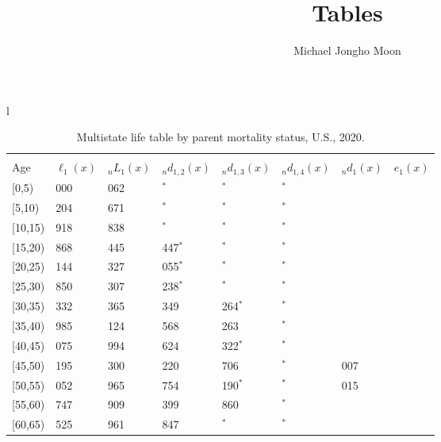 \documentclass[
]{article}
\title{Tables}
\author{Michael Jongho Moon}
\date{}
\begin{document}
\maketitle

\begin{table}
\caption{\label{tab:table-all}Multistate life table by parent mortality status, U.S., 2020.}

\centering
\fontsize{9}{11}\selectfont
\begin{tabular}[t]{l}
\hline
\begin{tabular}{>{\raggedright\arraybackslash}p{.45in}>{\raggedleft\arraybackslash}p{.65in}>{\raggedleft\arraybackslash}p{.65in}>{\raggedleft\arraybackslash}p{.65in}>{\raggedleft\arraybackslash}p{.65in}>{\raggedleft\arraybackslash}p{.65in}>{\raggedleft\arraybackslash}p{.65in}>{\raggedleft\arraybackslash}p{.65in}}
\toprule
\multicolumn{1}{c}{ } & \multicolumn{7}{c}{(1) Lost neither} \\
\cmidrule(l{3pt}r{3pt}){2-8}
Age & $\ell_{1}(x)$ & ${}_nL_{1}(x)$ & ${}_nd_{1,2}(x)$ & ${}_nd_{1,3}(x)$ & ${}_nd_{1,4}(x)$ & ${}_nd_{1}(x)$ & $e_{1}(x)$\\
\midrule
{}[0,5) & 100 000 & 495 062 & 176$^{*}$ & 0$^{*}$ & 0$^{*}$ & 620 & 46\\
{}[5,10) & 99 204 & 490 671 & 232$^{*}$ & 0$^{*}$ & 0$^{*}$ & 54 & 41\\
{}[10,15) & 98 918 & 482 838 & 970$^{*}$ & 0$^{*}$ & 0$^{*}$ & 79 & 36\\
{}[15,20) & 97 868 & 473 445 & 1 447$^{*}$ & 0$^{*}$ & 0$^{*}$ & 277 & 31\\
{}[20,25) & 96 144 & 463 327 & 1 055$^{*}$ & 735$^{*}$ & 0$^{*}$ & 504 & 26\\
\addlinespace
{}[25,30) & 93 850 & 440 307 & 1 238$^{*}$ & 660$^{*}$ & 0$^{*}$ & 619 & 22\\
{}[30,35) & 91 332 & 410 365 & 3 349 & 1 264$^{*}$ & 0$^{*}$ & 733 & 18\\
{}[35,40) & 85 985 & 378 124 & 4 568 & 2 263 & 246$^{*}$ & 834 & 13\\
{}[40,45) & 78 075 & 335 994 & 3 624 & 1 322$^{*}$ & 0$^{*}$ & 934 & 10\\
{}[45,50) & 72 195 & 263 300 & 5 220 & 2 706 & 210$^{*}$ & 1 007 & 6\\
\addlinespace
{}[50,55) & 63 052 & 180 965 & 5 754 & 1 190$^{*}$ & 346$^{*}$ & 1 015 & 4\\
{}[55,60) & 54 747 & 94 909 & 5 399 & 1 860 & 159$^{*}$ & 803 & 2\\
{}[60,65) & 46 525 & 35 961 & 1 847 & 770$^{*}$ & 431$^{*}$ & 445 & 1\\

\end{tabular}
\end{tabular}
\end{table}
\end{document}

